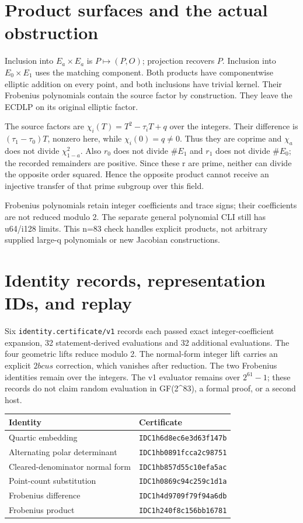 \documentclass[
  10pt,
]{article}
\begin{document}
\section{Product surfaces and the actual
obstruction}\label{product-surfaces-and-the-actual-obstruction}

Inclusion into \(E_a\times E_a\) is \(P\mapsto(P,O)\); projection
recovers \(P\). Inclusion into \(E_0\times E_1\) uses the matching
component. Both products have componentwise elliptic addition on every
point, and both inclusions have trivial kernel. Their Frobenius
polynomials contain the source factor by construction. They leave the
ECDLP on its original elliptic factor.

The source factors are \(\chi_i(T)=T^2-\tau_iT+q\) over the integers.
Their difference is \((\tau_1-\tau_0)T\), nonzero here, while
\(\chi_i(0)=q\ne0\). Thus they are coprime and \(\chi_a\) does not
divide \(\chi_{1-a}^2\). Also \(r_0\) does not divide \(\#E_1\) and
\(r_1\) does not divide \(\#E_0\); the recorded remainders are positive.
Since these r are prime, neither can divide the opposite order squared.
Hence the opposite product cannot receive an injective transfer of that
prime subgroup over this field.

Frobenius polynomials retain integer coefficients and trace signs; their
coefficients are not reduced modulo 2. The separate general polynomial
CLI still has u64/i128 limits. This n=83 check handles explicit
products, not arbitrary supplied large-q polynomials or new Jacobian
constructions.

\section{Identity records, representation IDs, and
replay}\label{identity-records-representation-ids-and-replay}

Six \texttt{identity.certificate/v1} records each passed exact
integer-coefficient expansion, 32 statement-derived evaluations and 32
additional evaluations. The four geometric lifts reduce modulo 2. The
normal-form integer lift carries an explicit \(2bcus\) correction, which
vanishes after reduction. The two Frobenius identities remain over the
integers. The v1 evaluator remains over \(2^{61}-1\); these records do
not claim random evaluation in GF(2\^{}83), a formal proof, or a second
host.

\begin{longtable}[]{@{}ll@{}}
\toprule\noalign{}
Identity & Certificate \\
\midrule\noalign{}
\endhead
\bottomrule\noalign{}
\endlastfoot
Quartic embedding & \texttt{IDC1h6d8ec6e3d63f147b} \\
Alternating polar determinant & \texttt{IDC1hb0891fcca2c98751} \\
Cleared-denominator normal form & \texttt{IDC1hb857d55c10efa5ac} \\
Point-count substitution & \texttt{IDC1h0869c94c259c1d1a} \\
Frobenius difference & \texttt{IDC1h4d9709f79f94a6db} \\
Frobenius product & \texttt{IDC1h240f8c156bb16781} \\
\end{longtable}
\end{document}
